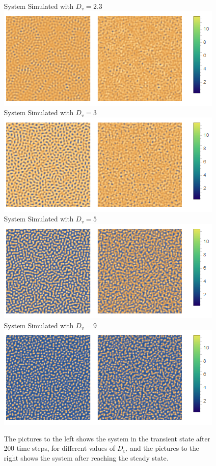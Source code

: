 \begin{figure}[h]
\centering
System Simulated with $D_v=2.3$\\
\includegraphics[scale=0.5]{img/2bd23Comb.png}\\
System Simulated with $D_v=3$\\
\includegraphics[scale=0.5]{img/2bd3Comb.png}\\
System Simulated with $D_v=5$\\
\includegraphics[scale=0.5]{img/2bd5Comb.png}\\
System Simulated with $D_v=9$\\
\includegraphics[scale=0.5]{img/2bd9Comb.png}\\
\caption{\label{fig:pic2b} The pictures to the left shows the system in the transient state after 200 time steps, for different values of $D_v$, and the pictures to the right shows the system after reaching the steady state.}
\end{figure}
